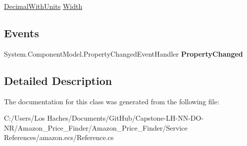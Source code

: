 \begin{DoxyCompactItemize}
\begin{DoxyCompactList}\small\item\em \end{DoxyCompactList}\item 
\hypertarget{class_amazon___price___finder_1_1amazon_1_1ecs_1_1_item_attributes_item_dimensions_a003f06d6cd06b5892f2014dfe74486b3}{\hyperlink{class_amazon___price___finder_1_1amazon_1_1ecs_1_1_decimal_with_units}{Decimal\-With\-Units} \hyperlink{class_amazon___price___finder_1_1amazon_1_1ecs_1_1_item_attributes_item_dimensions_a003f06d6cd06b5892f2014dfe74486b3}{Width}}\label{class_amazon___price___finder_1_1amazon_1_1ecs_1_1_item_attributes_item_dimensions_a003f06d6cd06b5892f2014dfe74486b3}

\begin{DoxyCompactList}\small\item\em \end{DoxyCompactList}\end{DoxyCompactItemize}
\subsection*{Events}
\begin{DoxyCompactItemize}
\item 
\hypertarget{class_amazon___price___finder_1_1amazon_1_1ecs_1_1_item_attributes_item_dimensions_a967dc69bbd682b7759ddcf491e45c72d}{System.\-Component\-Model.\-Property\-Changed\-Event\-Handler {\bfseries Property\-Changed}}\label{class_amazon___price___finder_1_1amazon_1_1ecs_1_1_item_attributes_item_dimensions_a967dc69bbd682b7759ddcf491e45c72d}

\end{DoxyCompactItemize}


\subsection{Detailed Description}


The documentation for this class was generated from the following file\-:\begin{DoxyCompactItemize}
\item 
C\-:/\-Users/\-Los Haches/\-Documents/\-Git\-Hub/\-Capstone-\/\-L\-H-\/\-N\-N-\/\-D\-O-\/\-N\-R/\-Amazon\-\_\-\-Price\-\_\-\-Finder/\-Amazon\-\_\-\-Price\-\_\-\-Finder/\-Service References/amazon.\-ecs/Reference.\-cs\end{DoxyCompactItemize}
